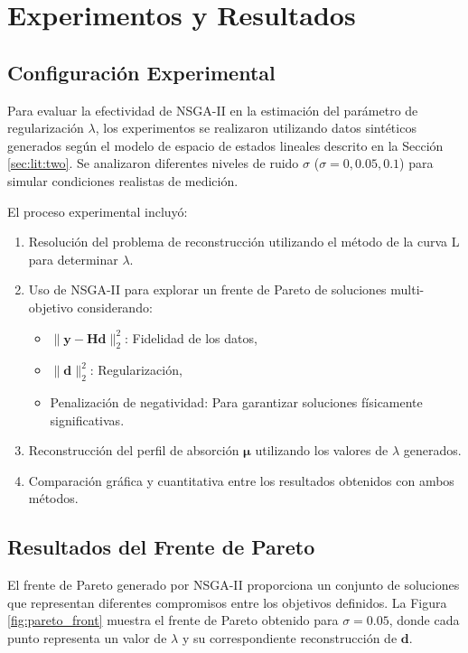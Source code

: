 \section{Experimentos y Resultados} \label{sec:results}

\subsection{Configuración Experimental} \label{sec:results:setup}

Para evaluar la efectividad de NSGA-II en la estimación del parámetro de regularización \( \lambda \), los experimentos se realizaron utilizando datos sintéticos generados según el modelo de espacio de estados lineales descrito en la Sección \ref{sec:lit:two}. Se analizaron diferentes niveles de ruido \( \sigma \) (\( \sigma = 0, 0.05, 0.1 \)) para simular condiciones realistas de medición.

El proceso experimental incluyó:
\begin{enumerate}
    \item Resolución del problema de reconstrucción utilizando el método de la curva L para determinar \( \lambda \).
    \item Uso de NSGA-II para explorar un frente de Pareto de soluciones multi-objetivo considerando:
    \begin{itemize}
        \item \( \| \mathbf{y} - \mathbf{H} \mathbf{d} \|_2^2 \): Fidelidad de los datos,
        \item \( \| \mathbf{d} \|_2^2 \): Regularización,
        \item Penalización de negatividad: Para garantizar soluciones físicamente significativas.
    \end{itemize}
    \item Reconstrucción del perfil de absorción \( \mathbf{\mu} \) utilizando los valores de \( \lambda \) generados.
    \item Comparación gráfica y cuantitativa entre los resultados obtenidos con ambos métodos.
\end{enumerate}

\subsection{Resultados del Frente de Pareto} \label{sec:results:pareto}

El frente de Pareto generado por NSGA-II proporciona un conjunto de soluciones que representan diferentes compromisos entre los objetivos definidos. La Figura \ref{fig:pareto_front} muestra el frente de Pareto obtenido para \( \sigma = 0.05 \), donde cada punto representa un valor de \( \lambda \) y su correspondiente reconstrucción de \( \mathbf{d} \).


